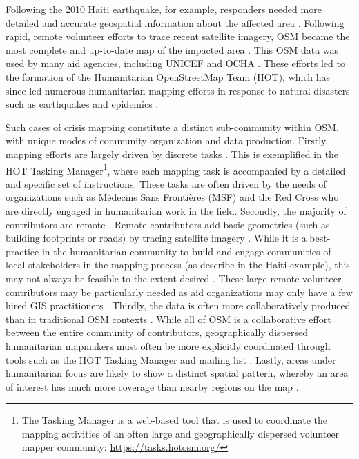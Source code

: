Following the 2010 Haiti earthquake, for example, responders needed more detailed and accurate geospatial information about the affected area  \parencite{meier_crisis_2012, soden_infrastructure_2016, zook_volunteered_2010}. Following rapid, remote volunteer efforts to trace recent satellite imagery, OSM became the most complete and up-to-date map of the impacted area \parencite{soden_crowdsourced_2014}. This OSM data was used by many aid agencies, including UNICEF and OCHA \parencite{soden_crowdsourced_2014}. These efforts led to the formation of the Humanitarian OpenStreetMap Team (HOT), which has since led numerous humanitarian mapping efforts in response to natural disasters such as earthquakes and epidemics \parencite{dittus_mass_2017}. 

Such cases of crisis mapping constitute a distinct sub-community within OSM, with unique modes of community organization and data production. Firstly, mapping efforts are largely driven by discrete tasks \parencite{vyncke_personal_2020}. This is exemplified in the HOT Tasking Manager\footnote{The Tasking Manager is a web-based tool that is used to coordinate the mapping activities of an often large and geographically dispersed volunteer mapper community: \url{https://tasks.hotosm.org/}}, where each mapping task is accompanied by a detailed and specific set of instructions. These tasks are often driven by the needs of organizations such as Médecins Sans Frontières (MSF) and the Red Cross who are directly engaged in humanitarian work in the field. Secondly, the majority of contributors are remote \parencite{eckle_quality_2015, vyncke_personal_2020}. Remote contributors add basic geometries (such as building footprints or roads) by tracing satellite imagery \parencite{vyncke_humanitarian_2015}. While it is a best-practice in the humanitarian community to build and engage communities of local stakeholders in the mapping process (as \textcite{soden_crowdsourced_2014} describe in the Haiti example), this may not always be feasible to the extent desired \parencite{vyncke_personal_2020}. These large remote volunteer contributors may be particularly needed as aid organizations may only have a few hired GIS practitioners \parencite[p. 2798]{soden_infrastructure_2016}. Thirdly, the data is often more collaboratively produced than in traditional OSM contexts \parencite{poiani_potential_2016, vyncke_personal_2020}. While all of OSM is a collaborative effort between the entire community of contributors, geographically dispersed humanitarian mapmakers must often be more explicitly coordinated through tools such as the HOT Tasking Manager and mailing list \parencite{palen_success_2015}. Lastly, areas under humanitarian focus are likely to show a distinct spatial pattern, whereby an area of interest has much more coverage than nearby regions on the map \parencite{anderson_crowd_2018}. 

